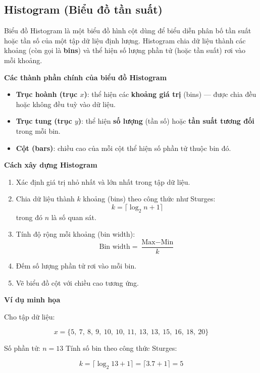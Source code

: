 \subsection {Histogram (Biểu đồ tần suất)}
\label{graph:hist}

Biểu đồ Histogram là một biểu đồ hình cột dùng để biểu diễn phân bố tần suất hoặc tần số của một tập dữ liệu định lượng. Histogram chia dữ liệu thành các khoảng (còn gọi là \textbf{bins}) và thể hiện số lượng phần tử (hoặc tần suất) rơi vào mỗi khoảng.

\textbf{Các thành phần chính của biểu đồ Histogram}

\begin{itemize}
    \item \textbf{Trục hoành (trục $x$)}: thể hiện các \textbf{khoảng giá trị} (bins) — được chia đều hoặc không đều tuỳ vào dữ liệu.
    \item \textbf{Trục tung (trục $y$)}: thể hiện \textbf{số lượng} (tần số) hoặc \textbf{tần suất tương đối} trong mỗi bin.
    \item \textbf{Cột (bars)}: chiều cao của mỗi cột thể hiện số phần tử thuộc bin đó.
\end{itemize}

\textbf{Cách xây dựng Histogram}

\begin{enumerate}
    \item Xác định giá trị nhỏ nhất và lớn nhất trong tập dữ liệu.
    \item Chia dữ liệu thành $k$ khoảng (bins) theo công thức như Sturges:
    \[
        k = \lceil \log_2 n + 1 \rceil
    \]
    trong đó $n$ là số quan sát.
    \item Tính độ rộng mỗi khoảng (bin width):
    \[
        \text{Bin width} = \frac{\text{Max} - \text{Min}}{k}
    \]
    \item Đếm số lượng phần tử rơi vào mỗi bin.
    \item Vẽ biểu đồ cột với chiều cao tương ứng.
\end{enumerate}

\textbf{Ví dụ minh họa}

Cho tập dữ liệu:

\[
x = \{5,\ 7,\ 8,\ 9,\ 10,\ 10,\ 11,\ 13,\ 13,\ 15,\ 16,\ 18,\ 20\}
\]

\noindent
Số phần tử: \(n = 13\)  
Tính số bin theo công thức Sturges:

\[
k = \lceil \log_2 13 + 1 \rceil = \lceil 3.7 + 1 \rceil = 5
\]

